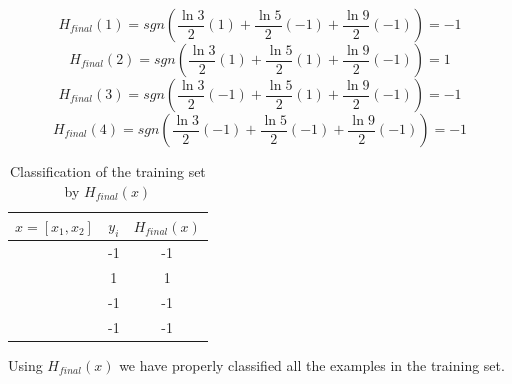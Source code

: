 \documentclass[11pt]{article}
\begin{document}
$$H_{final}(1) = sgn(\frac{\ln3}{2}(1) + \frac{\ln5}{2}(-1) + \frac{\ln9}{2}(-1)) = -1$$
$$H_{final}(2) = sgn(\frac{\ln3}{2}(1) + \frac{\ln5}{2}(1) + \frac{\ln9}{2}(-1)) = 1$$
$$H_{final}(3) = sgn(\frac{\ln3}{2}(-1) + \frac{\ln5}{2}(1) + \frac{\ln9}{2}(-1)) = -1$$
$$H_{final}(4) = sgn(\frac{\ln3}{2}(-1) + \frac{\ln5}{2}(-1) + \frac{\ln9}{2}(-1)) = -1$$

\begin{table}[H]
\centering
{\renewcommand{\arraystretch}{1.2}%
\begin{tabular}{| c | c | c |}
\hline
$x = [x_1, x_2]$& $y_i$ & $H_{final}(x)$\\
\hline
[1,1] & -1 & -1\\ \hline
[1,-1] & 1 & 1\\ \hline
[-1,-1] & -1 & -1\\ \hline
[-1,1] & -1 & -1\\ \hline
\end{tabular}}
\caption{Classification of the training set by $H_{final}(x)$}
\end{table}

Using $H_{final}(x)$ we have properly classified all the examples in the training set.
\end{document}
